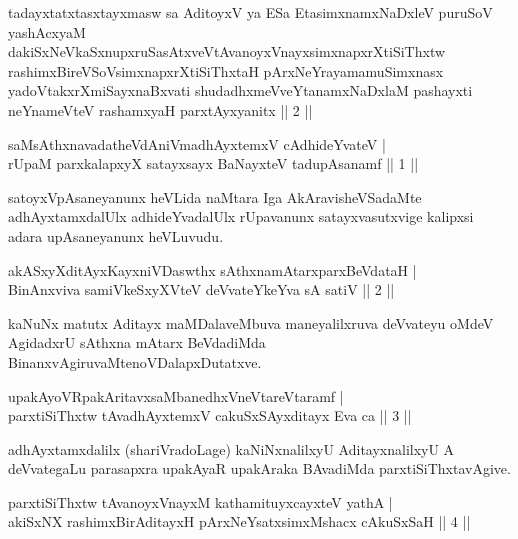 \begin{kandikeshl}
tadayxtatxtasxtayxmasw sa AditoyxV ya ESa EtasimxnamxNaDxleV puruSoV yashAcxyaM dakiSxNeV\s kaSxnupxruSasAtxveVtAvanoyxVnayxsimxnapxrXtiSiThxtw rashimx\-\break BireVSoV\s simxnapxrXtiSiThxtaH pArxNeYrayamamuSimxnasx yadoVtakxrXmiSayxnaBxvati shudadhxmeVveYtanamxNaDxlaM pashayxti neYnameVteV rashamxyaH parxtAyxyanitx || 2 ||
\end{kandikeshl}

\begin{shl}
saMsAthxnavadatheVdAniVmadhAyxtemxV cAdhideYvateV | \\
rUpaM parxkalapxyX satayxsayx BaNayxteV  tadupAsanamf \hfill ||  1 || 
\end{shl}

\begin{artha}
satoyxVpAsaneyanunx heVLida naMtara Iga AkAravisheVSadaMte adhAyxtamxdalUlx adhideYvadalUlx rUpavanunx satayxvasutxvige kalipxsi adara upAsaneyanunx heVLuvudu.
\end{artha}

\begin{shl}
akASxyXditAyxKayxniVDaswthx sAthxnamAtarxparxBeVdataH | \\
BinAnxviva samiVkeSxyXVteV deVvateYkeYva sA satiV \hfill ||  2 || 
\end{shl}

\begin{artha}
kaNuNx matutx Aditayx maMDalaveMbuva maneyalilxruva deVvateyu oMdeV AgidadxrU sAthxna mAtarx BeVdadiMda BinanxvAgiruvaMte\break noVDalapxDutatxve.
\end{artha}

\begin{shl}
upakAyoVRpakAritavxsaMbanedhxVneVtareVtaramf | \\
parxtiSiThxtw tAvadhAyxtemxV cakuSxSAyxditayx Eva ca \hfill ||  3 || 
\end{shl}

\begin{artha}
adhAyxtamxdalilx (shariVradoLage) kaNiNxnalilxyU AditayxnalilxyU A deVvategaLu parasapxra upakAyaR upakAraka BAvadiMda parxtiSiThxtavAgive.
\end{artha}

\begin{shl}
parxtiSiThxtw tAvanoyxVnayxM kathamituyxcayxteV yathA  | \\
akiSxNX rashimxBirAditayxH pArxNeYsatxsimxMshacx cAkuSxSaH \hfill ||  4 || 
\end{shl}

